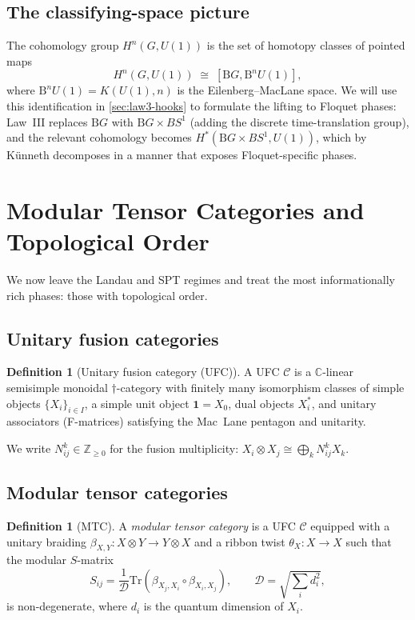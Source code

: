 \documentclass[12pt]{article}
\theoremstyle{plain}
\theoremstyle{definition}
\newtheorem{definition}[theorem]{Definition}
\theoremstyle{remark}
\newcommand{\BG}{\mathrm{B}G}
\newcommand{\Tr}{\mathrm{Tr}}
\begin{document}
\subsection{The classifying-space picture}

The cohomology group $H^{n}(G,U(1))$ is the set of homotopy classes of pointed maps
\[
H^{n}(G,U(1)) \;\cong\; [\BG, \mathrm{B}^{n} U(1)],
\]
where $\mathrm{B}^{n}U(1)=K(U(1),n)$ is the Eilenberg--MacLane space. We will use this
identification in \cref{sec:law3-hooks} to formulate the lifting to Floquet phases:
Law~III replaces $\BG$ with $\BG\times BS^{1}$ (adding the discrete time-translation
group), and the relevant cohomology becomes $H^{*}(\BG\times BS^{1},U(1))$, which by
K\"unneth decomposes in a manner that exposes Floquet-specific phases.

\section{Modular Tensor Categories and Topological Order}
\label{sec:mtc}

We now leave the Landau and SPT regimes and treat the most informationally rich phases:
those with topological order.

\subsection{Unitary fusion categories}

\begin{definition}[Unitary fusion category (UFC)]
\label{def:ufc}
A UFC $\mathcal{C}$ is a $\mathbb{C}$-linear semisimple monoidal $\dagger$-category
with finitely many isomorphism classes of simple objects $\{X_{i}\}_{i\in I}$, a simple
unit object $\mathbf{1}=X_{0}$, dual objects $X_{i}^{*}$, and unitary
associators (F-matrices) satisfying the Mac~Lane pentagon and unitarity.
\end{definition}

We write $N_{ij}^{k}\in\mathbb{Z}_{\geq 0}$ for the fusion multiplicity:
$X_{i}\otimes X_{j}\cong\bigoplus_{k}N_{ij}^{k}X_{k}$.

\subsection{Modular tensor categories}

\begin{definition}[MTC]
\label{def:mtc}
A \emph{modular tensor category} is a UFC $\mathcal{C}$ equipped with a unitary braiding
$\beta_{X,Y}:X\otimes Y\to Y\otimes X$ and a ribbon twist $\theta_{X}:X\to X$ such that
the modular $S$-matrix
\[
S_{ij} = \frac{1}{\mathcal{D}}\Tr(\beta_{X_{j},X_{i}}\circ\beta_{X_{i},X_{j}}),
\qquad \mathcal{D}=\sqrt{\sum_{i}d_{i}^{2}},
\]
is non-degenerate, where $d_{i}$ is the quantum dimension of $X_{i}$.
\end{definition}
\end{document}
